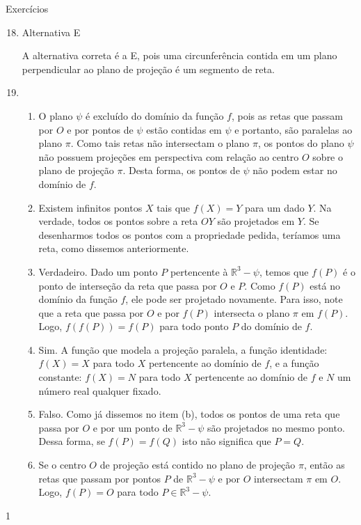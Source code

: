 \begin{answer}{Exercícios}
{\exerciselist
\begin{enumerate}\setcounter{enumi}{17}
\item Alternativa E

A alternativa correta é a E, pois uma circunferência contida em um plano perpendicular ao plano de projeção é um segmento de reta.

\item \begin{enumerate}
\item {} 
O plano \(\psi\) é excluído do domínio da função \(f\), pois as retas que passam por \(O\) e por pontos de \(\psi\) estão contidas em \(\psi\) e portanto, são paralelas ao plano \(\pi\). Como tais retas não intersectam o plano \(\pi\), os pontos do plano \(\psi\) não possuem projeções em perspectiva com relação ao centro \(O\) sobre o plano de projeção \(\pi\). Desta forma, os pontos de \(\psi\) não podem estar no domínio de \(f\).

\item {} 
Existem infinitos pontos \(X\) tais que \(f(X)=Y\) para um dado \(Y\). Na verdade, todos os pontos sobre a reta \(OY\) são projetados em \(Y\). Se desenharmos todos os pontos com a propriedade pedida, teríamos uma reta, como dissemos anteriormente.

\item {} 
Verdadeiro. Dado um ponto \(P\) pertencente à \({\mathbb R}^{3} - \psi\), temos que \(f(P)\) é o ponto de interseção da reta que passa por \(O\) e \(P\). Como \(f(P)\) está no domínio da função \(f\), ele pode ser projetado novamente. Para isso, note que a reta que passa por \(O\) e por \(f(P)\) intersecta o plano \(\pi\) em \(f(P)\). Logo, \(f(f(P)) = f(P)\) para todo ponto \(P\) do domínio de \(f\).

\item {} 
Sim. A função que modela a projeção paralela, a função identidade: \(f(X)=X\) para todo \(X\) pertencente ao domínio de \(f\),  e a função constante: \(f(X)=N\) para todo \(X\) pertencente ao domínio de \(f\) e \(N\) um número real qualquer fixado.

\item {} 
Falso. Como já dissemos no item (b), todos os pontos de uma reta que passa por \(O\) e por um ponto de \({\mathbb R}^{3} - \psi\) são projetados no mesmo ponto. Dessa forma, se \(f(P)=f(Q)\) isto não significa que \(P=Q\).

\item {} 
Se o centro \(O\) de projeção está contido no plano de projeção \(\pi\), então as retas que passam por pontos \(P\) de \({\mathbb R}^{3} - \psi\) e por \(O\) intersectam \(\pi\) em \(O\). Logo, \(f(P)=O\) para todo \(P\in{\mathbb R}^{3} - \psi\).

\end{enumerate}
\end{enumerate}
}{1}
\end{answer}
